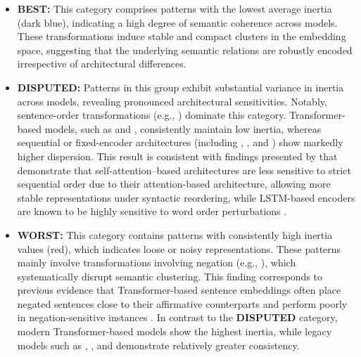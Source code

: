 \begin{itemize}
\item \textbf{BEST:}
This category comprises patterns with the lowest average inertia (dark blue), indicating a high degree of semantic coherence across models. These transformations induce stable and compact clusters in the embedding space, suggesting that the underlying semantic relations are robustly encoded irrespective of architectural differences.

\item \textbf{DISPUTED:}  
Patterns in this group exhibit substantial variance in inertia across models, revealing pronounced architectural sensitivities. Notably, sentence-order transformations (e.g., ) dominate this category. Transformer-based models, such as \esmall and \simcse, consistently maintain low inertia, whereas sequential or fixed-encoder architectures (including \elmo, \laser, and \infersent) show markedly higher dispersion. This result is consistent with findings presented by \cite{attention} that demonstrate that self-attention--based architectures are less sensitive to strict sequential order due to their attention-based architecture, allowing more stable representations under syntactic reordering, while LSTM-based encoders are known to be highly sensitive to word order perturbations \citep{conneau2018cram, dasgupta2018}.

\item \textbf{WORST:}  
This category contains patterns with consistently high inertia values (red), which indicates loose or noisy representations. These patterns mainly involve transformations involving negation (e.g., ), which systematically disrupt semantic clustering. This finding corresponds to previous evidence that Transformer-based sentence embeddings often place negated sentences close to their affirmative counterparts and perform poorly in negation-sensitive instances \citep{ettinger-2020-bert, hossain-etal-2022-analysis}. In contrast to the \textbf{DISPUTED} category, modern Transformer-based models show the highest inertia, while legacy models such as \elmo, \laser, and \infersent demonstrate relatively greater consistency.

\end{itemize}

